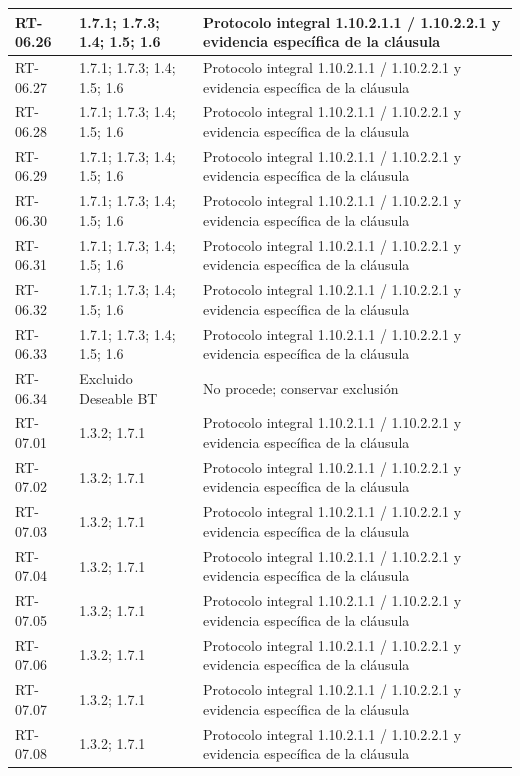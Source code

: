 \begin{longtable}{L{23mm}L{46mm}L{72mm}}
RT-06.26 & 1.7.1; 1.7.3; 1.4; 1.5; 1.6 & Protocolo integral 1.10.2.1.1 / 1.10.2.2.1 y evidencia específica de la cláusula\\\hline
RT-06.27 & 1.7.1; 1.7.3; 1.4; 1.5; 1.6 & Protocolo integral 1.10.2.1.1 / 1.10.2.2.1 y evidencia específica de la cláusula\\\hline
RT-06.28 & 1.7.1; 1.7.3; 1.4; 1.5; 1.6 & Protocolo integral 1.10.2.1.1 / 1.10.2.2.1 y evidencia específica de la cláusula\\\hline
RT-06.29 & 1.7.1; 1.7.3; 1.4; 1.5; 1.6 & Protocolo integral 1.10.2.1.1 / 1.10.2.2.1 y evidencia específica de la cláusula\\\hline
RT-06.30 & 1.7.1; 1.7.3; 1.4; 1.5; 1.6 & Protocolo integral 1.10.2.1.1 / 1.10.2.2.1 y evidencia específica de la cláusula\\\hline
RT-06.31 & 1.7.1; 1.7.3; 1.4; 1.5; 1.6 & Protocolo integral 1.10.2.1.1 / 1.10.2.2.1 y evidencia específica de la cláusula\\\hline
RT-06.32 & 1.7.1; 1.7.3; 1.4; 1.5; 1.6 & Protocolo integral 1.10.2.1.1 / 1.10.2.2.1 y evidencia específica de la cláusula\\\hline
RT-06.33 & 1.7.1; 1.7.3; 1.4; 1.5; 1.6 & Protocolo integral 1.10.2.1.1 / 1.10.2.2.1 y evidencia específica de la cláusula\\\hline
RT-06.34 & Excluido Deseable BT & No procede; conservar exclusión\\\hline
RT-07.01 & 1.3.2; 1.7.1 & Protocolo integral 1.10.2.1.1 / 1.10.2.2.1 y evidencia específica de la cláusula\\\hline
RT-07.02 & 1.3.2; 1.7.1 & Protocolo integral 1.10.2.1.1 / 1.10.2.2.1 y evidencia específica de la cláusula\\\hline
RT-07.03 & 1.3.2; 1.7.1 & Protocolo integral 1.10.2.1.1 / 1.10.2.2.1 y evidencia específica de la cláusula\\\hline
RT-07.04 & 1.3.2; 1.7.1 & Protocolo integral 1.10.2.1.1 / 1.10.2.2.1 y evidencia específica de la cláusula\\\hline
RT-07.05 & 1.3.2; 1.7.1 & Protocolo integral 1.10.2.1.1 / 1.10.2.2.1 y evidencia específica de la cláusula\\\hline
RT-07.06 & 1.3.2; 1.7.1 & Protocolo integral 1.10.2.1.1 / 1.10.2.2.1 y evidencia específica de la cláusula\\\hline
RT-07.07 & 1.3.2; 1.7.1 & Protocolo integral 1.10.2.1.1 / 1.10.2.2.1 y evidencia específica de la cláusula\\\hline
RT-07.08 & 1.3.2; 1.7.1 & Protocolo integral 1.10.2.1.1 / 1.10.2.2.1 y evidencia específica de la cláusula\\\hline

\end{longtable}
